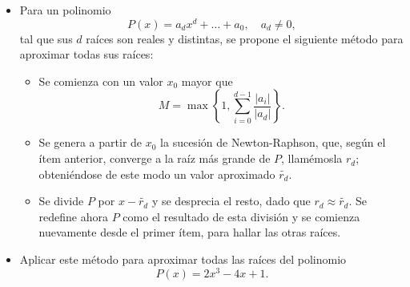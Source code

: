 \begin{itemize}
\begin{proof}
    \end{proof}
    \item Para un polinomio
    \[
    P(x) = a_d x^d + \dots + a_0, \quad a_d \neq 0,
    \]
    tal que sus $d$ raíces son reales y distintas, se propone el siguiente método para aproximar todas sus raíces:
    \begin{itemize}
        \item Se comienza con un valor $x_0$ mayor que
        \[
        M = \max \left\{ 1, \sum_{i=0}^{d-1} \frac{|a_i|}{|a_d|} \right\}.
        \]
        \item Se genera a partir de $x_0$ la sucesión de Newton-Raphson, que, según el ítem anterior, converge a la raíz más grande de $P$, llamémosla $r_d$; obteniéndose de este modo un valor aproximado $\tilde{r_d}$.
        \item Se divide $P$ por $x - \tilde{r_d}$ y se desprecia el resto, dado que $r_d \approx \tilde{r_d}$. Se redefine ahora $P$ como el resultado de esta división y se comienza nuevamente desde el primer ítem, para hallar las otras raíces.
    \end{itemize}
    \item Aplicar este método para aproximar todas las raíces del polinomio
    \[
    P(x) = 2x^3 - 4x + 1.
    \]
\end{itemize}
